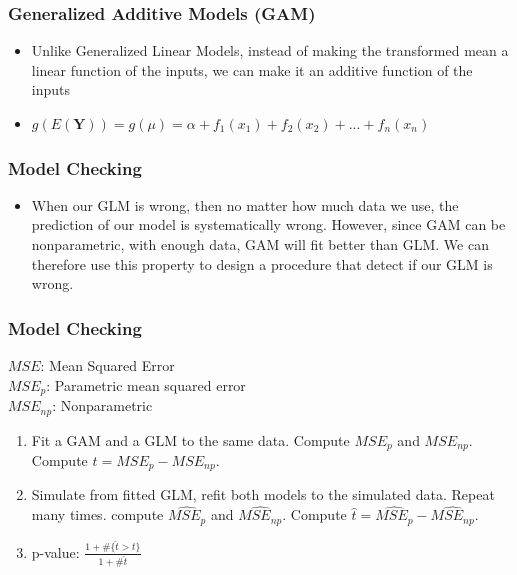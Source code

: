 \begin{frame}
\frametitle{Generalized Additive Models (GAM) }
\begin{itemize}
\item Unlike Generalized Linear Models, instead of making the transformed mean a linear function of the inputs, we can make it an additive function of the inputs
\item $g(E(\textbf{Y}))=g(\textbf{$\mu$})=\alpha + f_1(x_1) + f_2(x_2) + ... + f_n(x_n)$
\end{itemize}
\end{frame}

\begin{frame}
\frametitle{Model Checking}
\begin{itemize}
\item When our GLM is wrong, then no matter how much data we use, the prediction of our model is systematically wrong. However, since GAM can be nonparametric, with enough data, GAM will fit better than GLM. We can therefore use this property to design a procedure that detect if our GLM is wrong.
\end{itemize}
\end{frame}

\begin{frame}
\frametitle{Model Checking}
$MSE$: Mean Squared Error \\
$MSE_{p}$: Parametric mean squared error \\
$MSE_{np}$: Nonparametric \\
\begin{enumerate}
\item Fit a GAM and a GLM to the same data. Compute $MSE_p$ and $MSE_{np}$. Compute $t = MSE_p - MSE_{np}$.
\item Simulate from fitted GLM, refit both models to the simulated data. Repeat many times. compute $\hat{MSE_p}$ and $\hat{MSE_{np}}$. Compute $\hat{t} = \hat{MSE_p} - \hat{MSE_{np}}$.
\item p-value: $\frac{1 + \#\{\hat{t} > t\}}{1+\#\hat{t}}$
\end{enumerate}
\end{frame}

